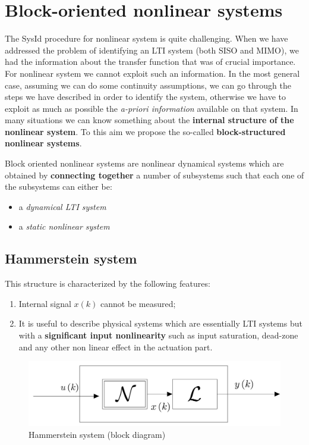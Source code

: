 \section{Block-oriented nonlinear systems}
The SysId procedure for nonlinear system is quite challenging. When we have addressed the problem of identifying an LTI system (both SISO and MIMO), we had the information about the transfer function that was of crucial importance. For nonlinear system we cannot exploit such an information. In the most general case, assuming we can do some continuity assumptions, we can go through the steps we have described in order to identify the system, otherwise we have to exploit as much as possible the \textit{a-priori information} available on that system. In many situations we can know something about the \textbf{internal structure of the nonlinear system}. To this aim we propose the so-called \textbf{block-structured nonlinear systems}.

\begin{definition} Block oriented nonlinear systems are nonlinear dynamical systems which are obtained by \textbf{connecting together} a number of subsystems such that each one of the subsystems can either be:
\begin{itemize}
    \itemsep-0.4em
    \item a \textit{dynamical LTI system}
    \item a \textit{static nonlinear system}
\end{itemize}

\end{definition}

\subsection{Hammerstein system}

This structure is characterized by the following features:
\begin{enumerate}
    \itemsep-0.3em
    \item Internal signal $x(k)$ cannot be measured;
    \item It is useful to describe physical systems which are essentially LTI systems but with a \textbf{significant input nonlinearity} such as input saturation, dead-zone and any other non linear effect in the actuation part.
\end{enumerate}
\begin{figure}[h]
    \centering
    \includegraphics[scale=0.2]{img/hammer.jpeg}
    \caption{Hammerstein system (block diagram)}
\end{figure}

